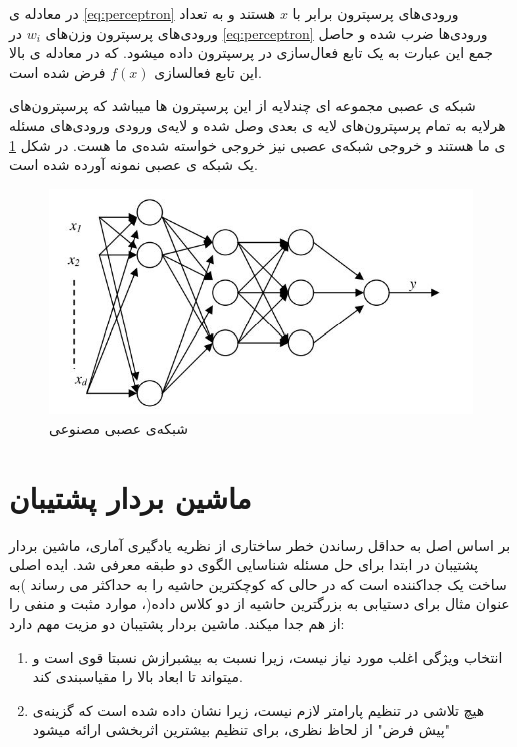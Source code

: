 در معادله ی \ref{eq:perceptron} ورودی‌های پرسپترون برابر با $x$ هستند و به تعداد ورودی‌های پرسپترون وزن‌های ‌$w_i$ در \ref{eq:perceptron} ورودی‌ها ضرب شده و حاصل جمع این عبارت به یک تابع فعال‌سازی در 
پرسپترون داده میشود. که در معادله ی بالا این تابع فعالسازی $f(x)$ فرض شده است.

شبکه ی عصبی مجموعه ای چندلایه از این پرسپترون ها میباشد که پرسپترون‌های هرلایه به تمام پرسپترون‌های لایه ی بعدی وصل شده و لایه‌ی ورودی ورودی‌های مسئله ی ما هستند و خروجی شبکه‌ی عصبی نیز خروجی خواسته شده‌ی ما هست.
در شکل \ref{fig:ann} یک شبکه ی عصبی نمونه آورده شده است.

\begin{figure}[ht!]
    \begin{center}
        \includegraphics[width=12cm]{images/ANN.jpg}
    \end{center}
    \caption[شبکه‌ی عصبی مصنوعی]{شبکه‌ی عصبی مصنوعی}
    \label{fig:ann}
    \end{figure}

\section{ماشین بردار پشتیبان}

بر اساس اصل به حداقل رساندن خطر ساختاری از نظریه یادگیری آماری، ماشین بردار پشتیبان در ابتدا برای حل مسئله
شناسایی الگوی دو طبقه معرفی شد. ایده اصلی ساخت یک جداکننده است که در حالی که کوچکترین حاشیه را به حداکثر می
رساند )به عنوان مثال برای دستیابی به بزرگترین حاشیه از دو کلاس داده(، موارد مثبت و منفی را از هم جدا میکند. ماشین بردار
پشتیبان دو مزیت مهم دارد:
\begin{enumerate}
    \item انتخاب ویژگی اغلب مورد نیاز نیست، زیرا نسبت به بیشبرازش نسبتا قوی است و میتواند تا
    ابعاد بالا را مقیاسبندی کند.
    \item هیچ تلاشی در تنظیم پارامتر لازم نیست، زیرا نشان داده شده است که گزینه‌ی "پیش فرض" از
    لحاظ نظری، برای تنظیم بیشترین اثربخشی ارائه میشود
\end{enumerate} 

